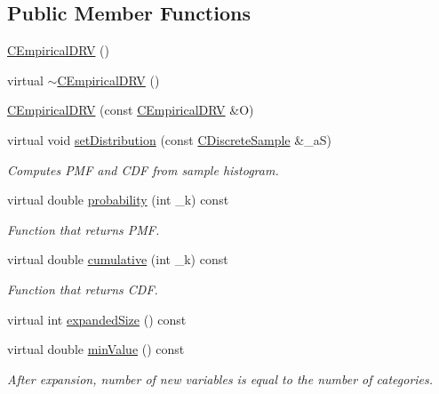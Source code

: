 \subsection*{Public Member Functions}
\begin{DoxyCompactItemize}
\item 
\hyperlink{class_c_empirical_d_r_v_a0b812bee54d50c33f987da3788a5da70}{C\-Empirical\-D\-R\-V} ()
\item 
virtual \hyperlink{class_c_empirical_d_r_v_af84a843f152e353a5ccac842685679c5}{$\sim$\-C\-Empirical\-D\-R\-V} ()
\item 
\hyperlink{class_c_empirical_d_r_v_a98462a73cfcab11dc73e5bb6f7244de4}{C\-Empirical\-D\-R\-V} (const \hyperlink{class_c_empirical_d_r_v}{C\-Empirical\-D\-R\-V} \&O)
\item 
virtual void \hyperlink{class_c_empirical_d_r_v_accbce4693814409137e7d77c5b36c910}{set\-Distribution} (const \hyperlink{class_c_discrete_sample}{C\-Discrete\-Sample} \&\-\_\-a\-S)
\begin{DoxyCompactList}\small\item\em Computes P\-M\-F and C\-D\-F from sample histogram. \end{DoxyCompactList}\item 
virtual double \hyperlink{class_c_empirical_d_r_v_a0bb8d31e01e419c3f8b77ecf034ca2a8}{probability} (int \-\_\-k) const 
\begin{DoxyCompactList}\small\item\em Function that returns P\-M\-F. \end{DoxyCompactList}\item 
virtual double \hyperlink{class_c_empirical_d_r_v_adab1bd8fb031410412f70d52d3ddb3e3}{cumulative} (int \-\_\-k) const 
\begin{DoxyCompactList}\small\item\em Function that returns C\-D\-F. \end{DoxyCompactList}\item 
virtual int \hyperlink{class_c_empirical_d_r_v_abb2052290e862d26d122b24aeeafa7cb}{expanded\-Size} () const 
\item 
virtual double \hyperlink{class_c_empirical_d_r_v_a85960e7ea87de4879f5893ad89b683f2}{min\-Value} () const 
\begin{DoxyCompactList}\small\item\em After expansion, number of new variables is equal to the number of categories. \end{DoxyCompactList}\item 

\end{DoxyCompactItemize}
